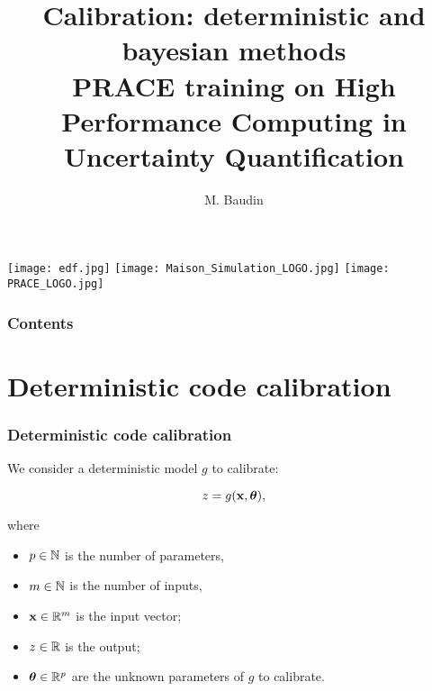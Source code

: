 \documentclass{beamer}
\title[PRACE/UQ: Calibration]{
Calibration: deterministic and bayesian methods \\
PRACE training on High Performance Computing in Uncertainty Quantification 
}
\author[Baudin]{
M. Baudin
}
\begin{document}

\begin{frame}
\titlepage
  
\begin{center}
\texttt{[image: edf.jpg]}
\hspace{1cm}
\texttt{[image: Maison\_Simulation\_LOGO.jpg]}
\hspace{1cm}
\texttt{[image: PRACE\_LOGO.jpg]}
\end{center}

\end{frame}


\begin{frame}
\frametitle{Contents}
\tableofcontents
\end{frame}

\section{Deterministic code calibration}


\begin{frame}
\frametitle{Deterministic code calibration}

We consider a deterministic model $g$ to calibrate:

$$
z = g({\bf x}, \boldsymbol{\theta}),
$$

where

\begin{itemize}
\item $p \in\mathbb{N}$ is the number of parameters, 
\item $m \in\mathbb{N}$ is the number of inputs, 
\item ${\bf x} \in \mathbb{R}^{m}$ is the input vector;
\item $z \in \mathbb{R}$ is the output;
\item $\boldsymbol{\theta} \in \mathbb{R}^p$ are the unknown parameters of 
      $g$ to calibrate.
\end{itemize}

\end{frame}

\end{document}
